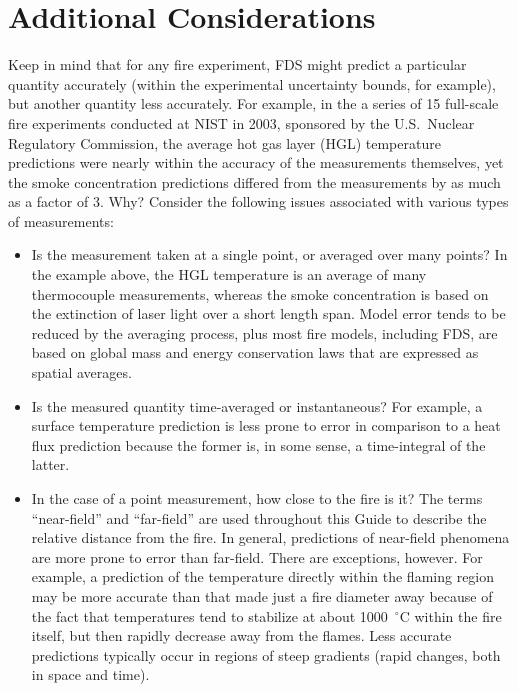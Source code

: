 \section{Additional Considerations}


Keep in mind that for any fire experiment, FDS might predict a particular quantity accurately (within the experimental uncertainty bounds, for
example), but another quantity less accurately. For example, in the a series of 15 full-scale fire experiments conducted at NIST in 2003, sponsored
by the U.S.~Nuclear Regulatory Commission, the average hot gas layer (HGL) temperature predictions were nearly within the accuracy of the measurements
themselves, yet the smoke concentration predictions differed from the measurements by as much as a factor of 3. Why? Consider the following issues
associated with various types of measurements:
\begin{itemize}
\item Is the measurement taken at a single point, or averaged over many points? In the example above, the HGL temperature is an average of many
thermocouple measurements, whereas the smoke concentration is based on the extinction of laser light over a short length span. Model error tends to
be reduced by the averaging process, plus most fire models, including FDS, are based on global mass and energy conservation laws that are expressed
as spatial averages.
\item Is the measured quantity time-averaged or instantaneous? For example, a surface temperature prediction is less prone to error in comparison to a
heat flux prediction because the former is, in some sense, a time-integral of the latter.
\item In the case of a point measurement, how close to the fire is it? The terms ``near-field'' and ``far-field'' are used throughout this Guide to describe
the relative distance from the fire. In general, predictions of near-field phenomena are more prone to error than far-field. There are exceptions,
however. For example, a prediction of the temperature directly within the flaming region may be more accurate than that made just a fire diameter
away because of the fact that temperatures tend to stabilize at about 1000~$^\circ$C within the fire itself, but then rapidly decrease away from the
flames. Less accurate predictions typically occur in regions of steep gradients (rapid changes, both in space and time).
\end{itemize}
